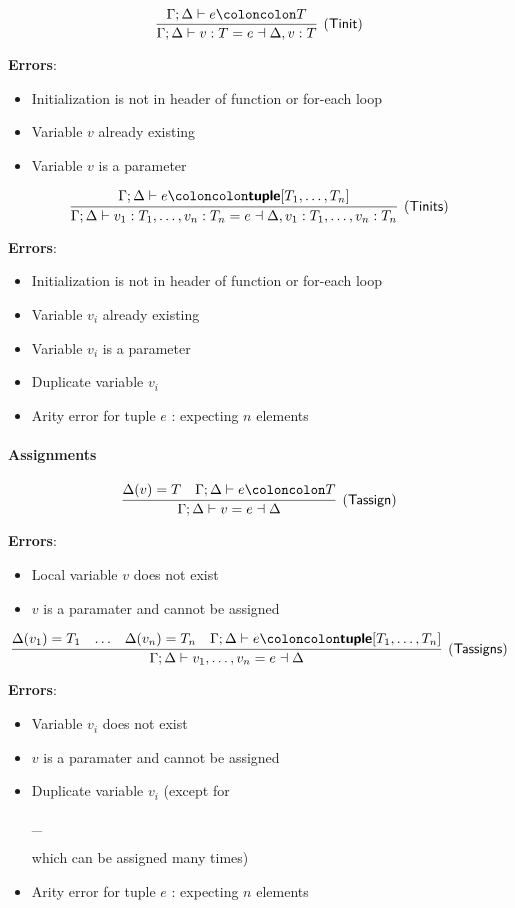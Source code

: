 \documentclass[a4paper]{article}
\newcommand{\kw}[1]{\textsf{\textbf{#1}}}
\newcommand{\code}[1]{\begin{sffamily}#1\end{sffamily}}
\newcommand{\colcol}{\coloncolon}
\newcommand{\fun}[1]{\mathsf{#1}}
\begin{document}
$$
\infer[(\fun{Tinit})]{\Gamma;\Delta \vdash v : T = e \dashv \Delta,v:T}
{\Gamma;\Delta \vdash e \colcol T}
$$

\textbf{Errors}:
\begin{itemize}
\item Initialization is not in header of function or for-each loop
\item Variable $v$ already existing
\item Variable $v$ is a parameter
\end{itemize}

$$
\infer[(\fun{Tinits})]{\Gamma;\Delta \vdash v_1 : T_1, \ldots, v_n : T_n = e \dashv \Delta,v_1:T_1,\ldots,v_n:T_n}
{\Gamma;\Delta \vdash e \colcol \kw{tuple}[T_1,\ldots,T_n]}
$$

\textbf{Errors}:
\begin{itemize}
\item Initialization is not in header of function or for-each loop
\item Variable $v_i$ already existing
\item Variable $v_i$ is a parameter
\item Duplicate variable $v_i$
\item Arity error for tuple $e$ : expecting $n$ elements
\end{itemize}

\paragraph{Assignments}

$$
\infer[(\fun{Tassign})]{\Gamma;\Delta \vdash v = e \dashv \Delta}
{\Delta(v)=T  \quad \Gamma;\Delta \vdash e \colcol T}
$$

\textbf{Errors}:
\begin{itemize}
\item Local variable $v$ does not exist
\item $v$ is a paramater and cannot be assigned
\end{itemize}

$$
\infer[(\fun{Tassigns})]{\Gamma;\Delta \vdash v_1, \ldots, v_n = e \dashv \Delta}
{\Delta(v_1)=T_1 & \ldots & \Delta(v_n)=T_n & \Gamma;\Delta \vdash e \colcol \kw{tuple}[T_1,\ldots,T_n]}
$$

\textbf{Errors}:
\begin{itemize}
\item Variable $v_i$ does not exist
\item $v$ is a paramater and cannot be assigned
\item Duplicate variable $v_i$  (except for \code{\_} which can be assigned many times)
\item Arity error for tuple $e$ : expecting $n$ elements
\end{itemize}
\end{document}
